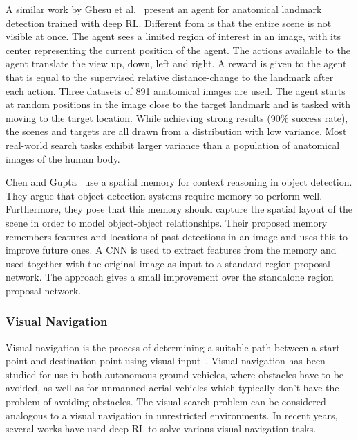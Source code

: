 A similar work by Ghesu et al.~\cite{ghesu_artificial_2016} present an agent for anatomical landmark detection trained with deep RL.
Different from \cite{caicedo_active_2015} is that the entire scene is not visible at once.
The agent sees a limited region of interest in an image, with its center representing the current position of the agent.
The actions available to the agent translate the view up, down, left and right.
A reward is given to the agent that is equal to the supervised relative distance-change to the landmark after each action.
Three datasets of 891 anatomical images are used.
The agent starts at random positions in the image close to the target landmark and is tasked with moving to the target location.
While achieving strong results (90\% success rate), the scenes and targets are all drawn from a distribution with low variance.
Most real-world search tasks exhibit larger variance than a population of anatomical images of the human body.

Chen and Gupta~\cite{chen_memory_2017} use a spatial memory for context reasoning in object detection.
They argue that object detection systems require memory to perform well.
Furthermore, they pose that this memory should capture the spatial layout of the scene in order to model object-object relationships.
Their proposed memory remembers features and locations of past detections in an image and uses this to improve future ones.
A CNN is used to extract features from the memory and used together with the original image as input to a standard region proposal network.
The approach gives a small improvement over the standalone region proposal network.

\subsubsection{Visual Navigation}

Visual navigation is the process of determining a suitable path between a start point and destination point using visual input~\cite{bonin-font_visnav_2008}.
Visual navigation has been studied for use in both autonomous ground vehicles, where obstacles have to be avoided, as well as for unmanned aerial vehicles which typically don't have the problem of avoiding obstacles.
The visual search problem can be considered analogous to a visual navigation in unrestricted environments.
In recent years, several works have used deep RL to solve various visual navigation tasks.

